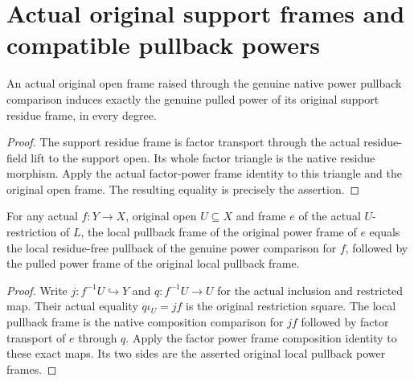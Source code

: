 \section{Actual original support frames and compatible pullback powers}

\begin{lemma}\label{lem:actual-original-support-power-frame}
\leanok
{}
An actual original open frame raised through the genuine native
power pullback comparison induces exactly the genuine pulled
power of its original support residue frame, in every degree.
\end{lemma}
\begin{proof}
The support residue frame is factor transport through the actual
residue-field lift to the support open. Its whole factor triangle
is the native residue morphism. Apply the actual factor-power
frame identity to this triangle and the original open frame.
The resulting equality is precisely the assertion.
\end{proof}

\begin{lemma}\label{lem:actual-local-pullback-power-frame}
\leanok
{}
For any actual $f:Y\to X$, original open $U\subseteq X$ and frame
$e$ of the actual $U$-restriction of $L$, the local pullback frame
of the original power frame of $e$ equals the local residue-free
pullback of the genuine power comparison for $f$, followed by the
pulled power frame of the original local pullback frame.
\end{lemma}
\begin{proof}
Write $j:f^{-1}U\hookrightarrow Y$ and $q:f^{-1}U\to U$ for the
actual inclusion and restricted map. Their actual equality
$q\iota_U=jf$ is the original restriction square. The local
pullback frame is the native composition comparison for $jf$
followed by factor transport of $e$ through $q$. Apply the factor
power frame composition identity to these exact maps. Its two
sides are the asserted original local pullback power frames.
\end{proof}

